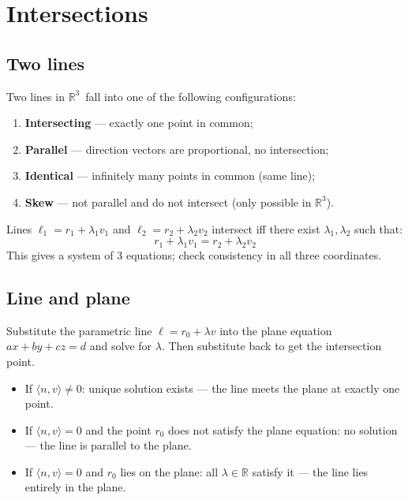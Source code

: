 \documentclass[11pt,a4paper]{article}
\theoremstyle{plain}
\theoremstyle{definition}
\theoremstyle{remark}
\newcommand{\R}{\mathbb{R}}
\newcommand{\rthree}{$\R^3$}
\begin{document}
\section{Intersections}

\subsection{Two lines}

Two lines in \rthree\ fall into one of the following configurations:
\begin{enumerate}[label=\roman*.]
    \item \textbf{Intersecting} — exactly one point in common;
    \item \textbf{Parallel} — direction vectors are proportional, no intersection;
    \item \textbf{Identical} — infinitely many points in common (same line);
    \item \textbf{Skew} — not parallel and do not intersect (only possible in \rthree).
\end{enumerate}

Lines $\ell_1 = r_1 + \lambda_1 v_1$ and
$\ell_2 = r_2 + \lambda_2 v_2$ intersect iff there exist
$\lambda_1, \lambda_2$ such that:
\[
r_1 + \lambda_1 v_1 = r_2 + \lambda_2 v_2
\]
This gives a system of 3 equations; check consistency in all three coordinates.

\subsection{Line and plane}

Substitute the parametric line $\ell = r_0 + \lambda v$ into the plane equation 
$ax + by + cz = d$ and solve for $\lambda$. Then substitute back to get the intersection point.  

\begin{itemize}[label={$\rightarrow$}]
    \item If $\langle n, v \rangle \neq 0$: unique solution exists — the line meets the plane at exactly one point.
    \item If $\langle n, v \rangle = 0$ and the point $r_0$ does not satisfy the plane equation: no solution — the line is parallel to the plane.
    \item If $\langle n, v \rangle = 0$ and $r_0$ lies on the plane: all $\lambda \in \R$ satisfy it — the line lies entirely in the plane.
\end{itemize}
\end{document}
